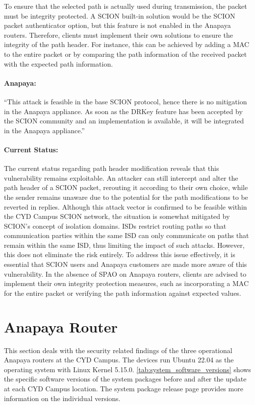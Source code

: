 To ensure that the selected path is actually used during transmission, the packet must be integrity protected.
A SCION built-in solution would be the SCION packet authenticator option, but this feature is not enabled in the Anapaya routers.
Therefore, clients must implement their own solutions to ensure the integrity of the path header.
For instance, this can be achieved by adding a MAC to the entire packet or by comparing the path information of the received packet with the expected path information.

\begin{boxH}
\paragraph{Anapaya:}
``This attack is feasible in the base SCION protocol, hence there is no mitigation in the Anapaya appliance. As soon as the DRKey feature has been accepted by the SCION community and an implementation is available, it will be integrated in the Anapaya appliance.''
\end{boxH}
\newpage
\paragraph{Current Status:}
The current status regarding path header modification reveals that this vulnerability remains exploitable.
An attacker can still intercept and alter the path header of a SCION packet, rerouting it according to their own choice, while the sender remains unaware due to the potential for the path modifications to be reverted in replies.
Although this attack vector is confirmed to be feasible within the CYD Campus SCION network, the situation is somewhat mitigated by SCION's concept of isolation domains.
ISDs restrict routing paths so that communication parties within the same ISD can only communicate on paths that remain within the same ISD, thus limiting the impact of such attacks.
However, this does not eliminate the risk entirely.
To address this issue effectively, it is essential that SCION users and Anapaya customers are made more aware of this vulnerability.
In the absence of SPAO on Anapaya routers, clients are advised to implement their own integrity protection measures, such as incorporating a MAC for the entire packet or verifying the path information against expected values.

\section{Anapaya Router}
\label{sec:findings:anapaya-router}
This section deals with the security related findings of the three operational Anapaya routers at the CYD Campus.
The devices run Ubuntu 22.04 as the operating system with Linux Kernel 5.15.0.
\cref{tab:system_software_versions} shows the specific software versions of the system packages before and after the update at each CYD Campus location.
The system package release page \cite{anapayaSystemPackage} provides more information on the individual versions.

